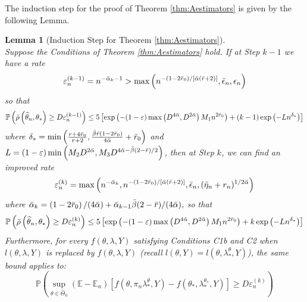 \documentclass[12pt]{article}
\theoremstyle{myplain}
\newtheorem{lemma}{Lemma}[section]
\theoremstyle{definition}
\theoremstyle{definition}
\theoremstyle{remark}
\numberwithin{equation}{section}
\begin{document}
The induction step for the proof of Theorem \ref{thm:Aestimators} is given by the following Lemma.
\begin{lemma}[Induction Step for Theorem \ref{thm:Aestimators}]\label{lem:shenstep2}\ \\
Suppose the Conditions of Theorem \ref{thm:Aestimators} hold. If at Step $k-1$ we have a rate
$$
\varepsilon_{n}^{(k-1)}=n^{-{\Bar\alpha}_{k}-1}>\max \left(n^{-\left(1-2 {\Bar r_0}\right) /[{\Bar\alpha}(\Bar r+2)]}, {\Bar\epsilon}_n, \epsilon_n\right)
$$
so that
\begin{equation*}
\mathbb{P}\left(\Bar\rho\left(\widehat{\theta}_{n}, \theta_*\right) \geq D \varepsilon_{n}^{(k-1)}\right) \leq 5\left[\exp \left(-(1-\varepsilon) \max \left(D^{4 {\Bar\alpha}}, D^{2 {\Bar\alpha}}\right) M_{1} n^{2 {\Bar r_0}}\right)+(k-1) \exp \left(-L n^{\delta_*}\right)\right]
\end{equation*}
where $\delta_*=\min \left(\frac{r+4 {\Bar r_0}}{r+2}, \frac{{\Bar\beta} \Bar r\left(1-2 {\Bar r_0}\right)}{4 {\Bar\alpha}}+{\Bar r_0}\right)$ and $L=(1-\varepsilon) \min \left(M_{2} D^{2 {\Bar\alpha}}, M_{3} D^{4 {\Bar\alpha}-{\Bar\beta}(2-\Bar r) / 2}\right)$, then at Step $k$, we can find an improved rate
$$
\varepsilon_{n}^{(k)}=\max \left(n^{-{\Bar\alpha}_{k}}, n^{-\left(1-2 {\Bar r_0}\right) /[{\Bar\alpha}(\Bar r+2)]}, {\Bar\epsilon}_n, ({\Bar\eta}_n+r_n)^{1/2{\Bar\alpha}}\right)
$$
where ${\Bar\alpha}_{k}=\left(1-2 {\Bar r_0}\right) /(4 {\Bar\alpha})+{\Bar\alpha}_{k-1} {\Bar\beta}(2-\Bar r) /(4 {\Bar\alpha}),$ so that
\begin{equation*}
\mathbb{P}\left(\Bar\rho\left(\widehat{\theta}_{n}, \theta_*\right) \geq D \varepsilon_{n}^{(k)}\right) \leq 5\left[\exp \left(-(1-\varepsilon) \max \left(D^{4 {\Bar\alpha}}, D^{2 {\Bar\alpha}}\right) M_{1} n^{2 {\Bar r_0}}\right)+k \exp \left(-L {n}^{\delta_*}\right)\right]
\end{equation*}
Furthermore, for every $f(\theta,\lambda, Y)$ satisfying Conditions C1b and C2 when $l(\theta, \lambda, Y)$ is replaced by $f(\theta, \lambda, Y)$ (recall $l(\theta, Y)=l(\theta, \lambda_*^\theta, Y)$), the same bound applies to:
$$
\mathbb{P}\left(\sup_{\theta\in\widehat{\Theta}_n} (\mathbb{E}-\mathbb{E}_n)[f(\theta, \pi_n\lambda_*^{\theta}, Y)-f(\theta_*,\lambda_*^{\theta_*}, Y)] \geq D \varepsilon_{n}^{(k)}\right)
$$
\end{lemma}
\end{document}
